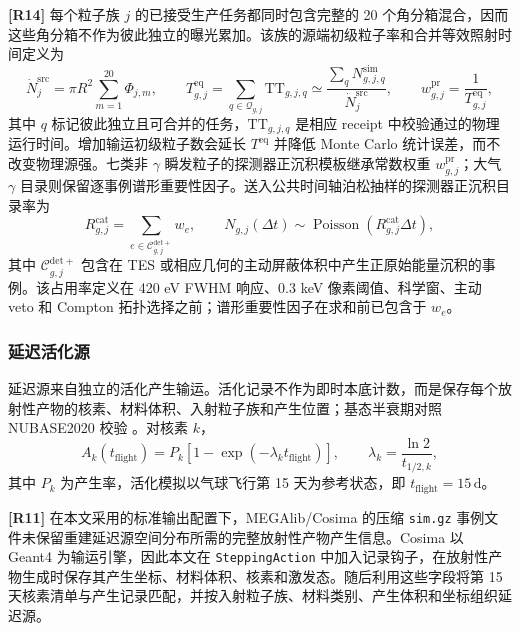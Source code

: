 \documentclass[11pt]{article}
\newcommand{\revblue}[1]{\textcolor{revisionblue}{#1}}
\begin{document}
\begingroup
\color{revisionblue}
\noindent\textbf{[R14]} 每个粒子族 $j$ 的已接受生产任务都同时包含完整的 20 个角分箱混合，因而这些角分箱不作为彼此独立的曝光累加。该族的源端初级粒子率和合并等效照射时间定义为
\begin{equation}
 \dot N^{\mathrm{src}}_{j}=\pi R^2\sum_{m=1}^{20}\Phi_{j,m},
 \qquad
 T^{\mathrm{eq}}_{g,j}=\sum_{q\in\mathcal Q_{g,j}}\mathrm{TT}_{g,j,q}
 \simeq
 \frac{\sum_q N^{\mathrm{sim}}_{g,j,q}}{\dot N^{\mathrm{src}}_{j}},
 \qquad
 w^{\mathrm{pr}}_{g,j}=\frac{1}{T^{\mathrm{eq}}_{g,j}},
 \label{eq:prompt_equivalent_exposure_zh}
\end{equation}
其中 $q$ 标记彼此独立且可合并的任务，$\mathrm{TT}_{g,j,q}$ 是相应 receipt 中校验通过的物理运行时间。增加输运初级粒子数会延长 $T^{\mathrm{eq}}$ 并降低 Monte Carlo 统计误差，而不改变物理源强。七类非 $\gamma$ 瞬发粒子的探测器正沉积模板继承常数权重 $w^{\mathrm{pr}}_{g,j}$；\revblue{大气 $\gamma$ 目录}则保留逐事例谱形重要性因子。送入公共时间轴泊松抽样的探测器正沉积目录率为
\begin{equation}
 R^{\mathrm{cat}}_{g,j}=\sum_{e\in\mathcal C^{\mathrm{det+}}_{g,j}}w_e,
 \qquad
 N_{g,j}(\Delta t)\sim
 \operatorname{Poisson}\!\left(R^{\mathrm{cat}}_{g,j}\Delta t\right),
 \label{eq:catalog_poisson_rate_zh}
\end{equation}
其中 $\mathcal C^{\mathrm{det+}}_{g,j}$ 包含在 TES 或相应几何的主动屏蔽体积中产生正原始能量沉积的事例。该占用率定义在 420 eV FWHM 响应、0.3 keV 像素阈值、科学窗、主动 veto 和 Compton 拓扑选择之前；谱形重要性因子在求和前已包含于 $w_e$。
\endgroup

\subsubsection{延迟活化源}
\label{subsec:delayed_source}

延迟源来自独立的活化产生输运。活化记录不作为即时本底计数，而是保存每个放射性产物的核素、材料体积、入射粒子族和产生位置；基态半衰期对照 NUBASE2020 校验 \cite{Kondev2021NUBASE}。对核素 $k$，
\begin{equation}
  A_k(t_{\mathrm{flight}})=P_k\left[1-\exp(-\lambda_k t_{\mathrm{flight}})\right],
  \qquad \lambda_k=\frac{\ln2}{t_{1/2,k}},
\end{equation}
其中 $P_k$ 为产生率，活化模拟以气球飞行第 15 天为参考状态，即
$t_{\mathrm{flight}}=15\,\mathrm{d}$。

\begingroup
\color{revisionblue}
\noindent\textbf{[R11]} 在本文采用的标准输出配置下，MEGAlib/Cosima 的压缩 \texttt{sim.gz} 事例文件未保留重建延迟源空间分布所需的完整放射性产物产生信息。Cosima 以 Geant4 为输运引擎，因此本文在 \texttt{SteppingAction} 中加入记录钩子，在放射性产物生成时保存其产生坐标、材料体积、核素和激发态。随后利用这些字段将第 15 天核素清单与产生记录匹配，并按入射粒子族、材料类别、产生体积和坐标组织延迟源。
\end{document}
